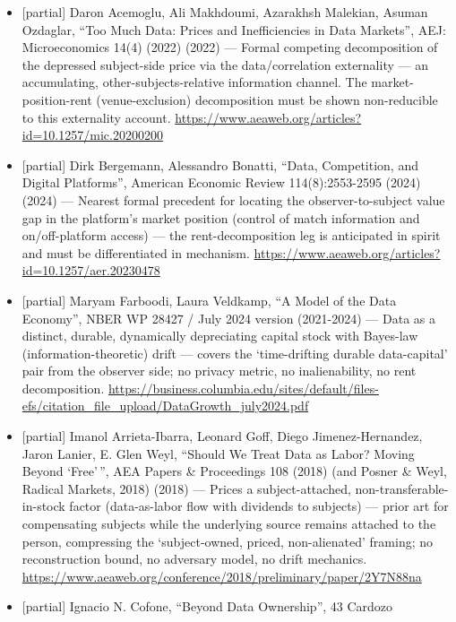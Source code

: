 \documentclass[
  11pt,
]{article}
\begin{document}
\begin{itemize}
  `adversary-relative reconstruction bound' leg alone.
  \url{https://arxiv.org/abs/2201.04845}
\item
  {[}partial{]} Daron Acemoglu, Ali Makhdoumi, Azarakhsh Malekian,
  Asuman Ozdaglar, ``Too Much Data: Prices and Inefficiencies in Data
  Markets'', AEJ: Microeconomics 14(4) (2022) (2022) --- Formal
  competing decomposition of the depressed subject-side price via the
  data/correlation externality --- an accumulating,
  other-subjects-relative information channel. The market-position-rent
  (venue-exclusion) decomposition must be shown non-reducible to this
  externality account.
  \url{https://www.aeaweb.org/articles?id=10.1257/mic.20200200}
\item
  {[}partial{]} Dirk Bergemann, Alessandro Bonatti, ``Data, Competition,
  and Digital Platforms'', American Economic Review 114(8):2553-2595
  (2024) (2024) --- Nearest formal precedent for locating the
  observer-to-subject value gap in the platform's market position
  (control of match information and on/off-platform access) --- the
  rent-decomposition leg is anticipated in spirit and must be
  differentiated in mechanism.
  \url{https://www.aeaweb.org/articles?id=10.1257/aer.20230478}
\item
  {[}partial{]} Maryam Farboodi, Laura Veldkamp, ``A Model of the Data
  Economy'', NBER WP 28427 / July 2024 version (2021-2024) --- Data as a
  distinct, durable, dynamically depreciating capital stock with
  Bayes-law (information-theoretic) drift --- covers the `time-drifting
  durable data-capital' pair from the observer side; no privacy metric,
  no inalienability, no rent decomposition.
  \url{https://business.columbia.edu/sites/default/files-efs/citation_file_upload/DataGrowth_july2024.pdf}
\item
  {[}partial{]} Imanol Arrieta-Ibarra, Leonard Goff, Diego
  Jimenez-Hernandez, Jaron Lanier, E. Glen Weyl, ``Should We Treat Data
  as Labor? Moving Beyond `Free'\,'', AEA Papers \& Proceedings 108
  (2018) (and Posner \& Weyl, Radical Markets, 2018) (2018) --- Prices a
  subject-attached, non-transferable-in-stock factor (data-as-labor flow
  with dividends to subjects) --- prior art for compensating subjects
  while the underlying source remains attached to the person,
  compressing the `subject-owned, priced, non-alienated' framing; no
  reconstruction bound, no adversary model, no drift mechanics.
  \url{https://www.aeaweb.org/conference/2018/preliminary/paper/2Y7N88na}
\item
  {[}partial{]} Ignacio N. Cofone, ``Beyond Data Ownership'', 43 Cardozo

\end{itemize}
\end{document}
